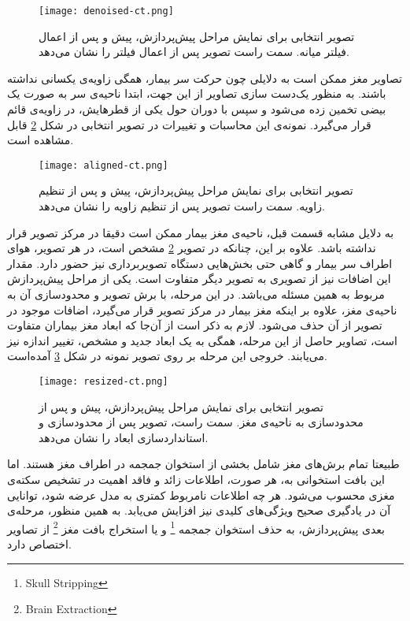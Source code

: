 \begin{figure}[ht]
\centering
\texttt{[image: denoised-ct.png]}
\caption[]{تصویر انتخابی برای نمایش مراحل پیش‌پردازش، پیش و پس از اعمال فیلتر میانه. سمت راست تصویر پس از اعمال فیلتر را نشان می‌دهد.}
\label{fig:denoised-ct}
\end{figure}
    
تصاویر مغز ممکن است به دلایلی چون حرکت سر بیمار، همگی زاویه‌ی یکسانی نداشته باشند.
به منظور یک‌دست سازی تصاویر از این جهت، ابتدا ناحیه‌ی سر به صورت یک بیضی تخمین زده می‌شود و سپس با دوران حول یکی از قطر‌هایش، در زاویه‌ی قائم قرار می‌گیرد.
نمونه‌ی این محاسبات و تغییرات در تصویر انتخابی در شکل \ref{fig:aligned-ct}
قابل مشاهده است.

\begin{figure}[ht]
\centering
\texttt{[image: aligned-ct.png]}
\caption[]{تصویر انتخابی برای نمایش مراحل پیش‌پردازش، پیش و پس از تنظیم زاویه. سمت راست تصویر پس از تنظیم زاویه را نشان می‌دهد.}
\label{fig:aligned-ct}
\end{figure}

به دلایل مشابه قسمت قبل، ناحیه‌ی مغز بیمار ممکن است دقیقا در مرکز تصویر قرار نداشته باشد.
علاوه بر این، چنانکه در تصویر \ref{fig:aligned-ct} مشخص است، 
در هر تصویر، هوای اطراف سر بیمار و گاهی حتی بخش‌هایی دستگاه تصویربرداری نیز حضور دارد.
مقدار این اضافات نیز از تصویری به تصویر دیگر متفاوت است.
یکی از مراحل پیش‌پردازش مربوط به همین مسئله می‌باشد.
در این مرحله،
با برش تصویر و محدودسازی آن به ناحیه‌ی مغز،
علاوه بر اینکه مغز بیمار در مرکز تصویر قرار می‌گیرد، اضافات موجود در تصویر از آن حذف می‌شود.
لازم به ذکر است از آن‌جا که ابعاد مغز بیماران متفاوت است، تصاویر حاصل از این مرحله، همگی به یک ابعاد جدید و مشخص، تغییر اندازه نیز می‌یابند.
خروجی این مرحله بر روی تصویر نمونه در شکل 
\ref{fig:resized-ct}
آمده‌است.

\begin{figure}[ht]
\centering
\texttt{[image: resized-ct.png]}
\caption[]{تصویر انتخابی برای نمایش مراحل پیش‌پردازش، پیش و پس از محدودسازی به ناحیه‌ی مغز. سمت راست، تصویر پس از محدودسازی و استانداردسازی ابعاد را نشان می‌دهد.}
\label{fig:resized-ct}
\end{figure}


طبیعتا تمام برش‌های مغز شامل بخشی از استخوان جمجمه در اطراف مغز هستند.
اما این بافت استخوانی به، هر صورت، اطلاعات زائد و فاقد اهمیت در تشخیص سکته‌ی مغزی محسوب می‌شود.
هر چه اطلاعات نامربوط کمتری به مدل عرضه شود، توانایی آن در یادگیری صحیح ویژگی‌های کلیدی نیز افزایش می‌یابد.
به همین منظور، مرحله‌ی بعدی پیش‌پردازش، به حذف استخوان جمجمه
\footnote{Skull Stripping}
و یا استخراج بافت مغز
\footnote{Brain Extraction}
از تصاویر اختصاص دارد.\\


